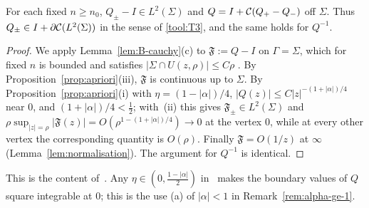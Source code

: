 \begin{corollary}\label{cor:L2}
For each fixed $n\ge n_0$, $Q_\pm-I\in L^2(\Sigma)$ and $Q=I+\mathcal{C}(Q_+-Q_-)$ off $\Sigma$. Thus $Q_\pm\in I+\partial\mathcal{C}(L^2(\Sigma))$ in
the sense of \ref{tool:T3}, and the same holds for $Q^{-1}$.
\end{corollary}

\begin{proof}
We apply Lemma~\ref{lem:B-cauchy}(c) to $\mathfrak F:=Q-I$ on $\Gamma=\Sigma$, which for fixed $n$ is bounded and satisfies
$|\Sigma\cap U(z,\rho)|\le C\rho$ . By Proposition~\ref{prop:apriori}(iii), $\mathfrak F$ is continuous up to $\Sigma$. By
Proposition~\ref{prop:apriori}(i) with $\eta=(1-|\alpha|)/4$, $|Q(z)|\le C|z|^{-(1+|\alpha|)/4}$ near $0$, and
$(1+|\alpha|)/4<\frac12$; with~(ii) this gives $\mathfrak F_\pm\in L^2(\Sigma)$ and
$\rho\sup_{|z|=\rho}|\mathfrak F(z)|=O(\rho^{1-(1+|\alpha|)/4})\to0$ at the vertex $0$, while at every other vertex the
corresponding quantity is $O(\rho)$. Finally $\mathfrak F=O(1/z)$ at $\infty$ (Lemma~\ref{lem:normalisation}). The argument for
$Q^{-1}$ is identical.
\end{proof}

\noindent This is the content of~. Any $\eta\in(0,\frac{1-|\alpha|}2)$ in~ makes the boundary values of $Q$ square
integrable at $0$; this is the use (a) of $|\alpha|<1$ in Remark~\ref{rem:alpha-ge-1}.
